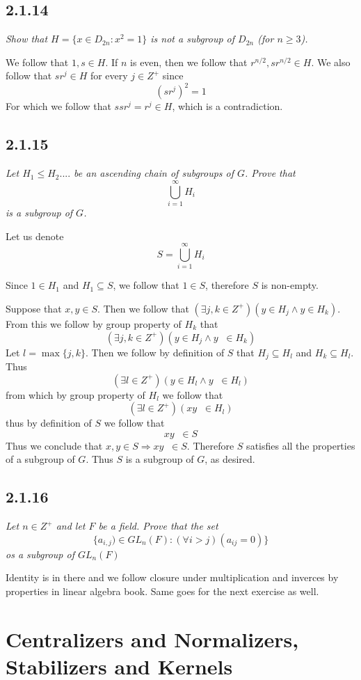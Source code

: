 \documentclass[11pt,oneside,titlepage]{book}
\DeclareMathOperator \inv {^{-1}}
\DeclareMathOperator \ra {\Rightarrow}
\begin{document}
\subsection*{2.1.14}

\textit{Show that $H = \{x \in D_{2n}: x^2 = 1\}$ is not a subgroup of $D_{2n}$ (for $n \geq 3$).}

We follow that $1, s  \in H$. If $n$ is even, then we follow that $r^{n/2},  sr^{n/2} \in H$.
We also follow that $sr^j \in H$ for every $j \in Z^+$ since
$$(sr^j)^2 =  1$$
For which we follow that $s sr^j = r^j \in H$, which is a contradiction.

\subsection*{2.1.15}

\textit{Let $H_1 \leq H_2 .... $ be an ascending chain of subgroups of $G$. Prove that
  $$\bigcup_{i = 1}^{\infty} H_i$$
  is a subgroup of $G$.}

Let us denote
$$S = \bigcup_{i = 1}^{\infty} H_i$$

Since $1 \in H_1$ and $H_1 \subseteq S$, we follow that $1 \in S$, therefore $S$ is non-empty.

Suppose that $x, y \in S$. Then we follow that $(\exists j, k \in Z^+)(y \in H_j \land y \in H_k)$.
From this we follow by group property of $H_k$ that
$$(\exists j, k \in Z^+)(y \in H_j \land y\inv \in H_k)$$
Let $l = \max\{j, k\}$. Then we follow by definition of $S$ that $H_j \subseteq H_l$
and $H_k \subseteq H_l$. Thus
$$(\exists l \in Z^+)(y \in H_l \land y\inv \in H_l)$$
from which by group property of $H_l$ we follow that
$$(\exists l \in Z^+)(xy\inv \in H_l)$$
thus by definition of $S$ we follow that
$$xy\inv \in S$$
Thus we conclude that $x, y \in S \ra xy\inv \in S$. Therefore $S$ satisfies all the
properties of a subgroup of $G$. Thus $S$ is a subgroup of $G$, as desired.

\subsection*{2.1.16}


\textit{Let $n \in Z^+$ and let $F$ be a field. Prove that the set
  $$\{a_{i, j}) \in GL_n(F): (\forall i > j )(a_{ij} = 0)\}$$
  os a subgroup of $GL_n(F)$}

Identity is in there and we follow closure under multiplication and inverces by properties
in linear algebra book. Same goes for the next exercise as well.

\section{Centralizers and Normalizers, Stabilizers and Kernels}
\end{document}
